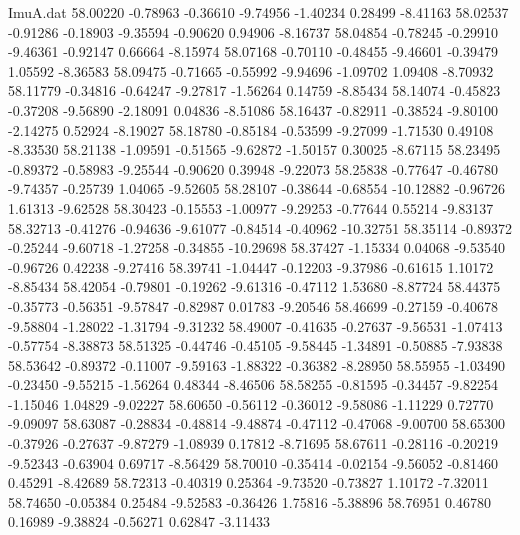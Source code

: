 \begin{filecontents}{ImuA.dat}
  58.00220   -0.78963   -0.36610   -9.74956   -1.40234    0.28499   -8.41163
  58.02537   -0.91286   -0.18903   -9.35594   -0.90620    0.94906   -8.16737
  58.04854   -0.78245   -0.29910   -9.46361   -0.92147    0.66664   -8.15974
  58.07168   -0.70110   -0.48455   -9.46601   -0.39479    1.05592   -8.36583
  58.09475   -0.71665   -0.55992   -9.94696   -1.09702    1.09408   -8.70932
  58.11779   -0.34816   -0.64247   -9.27817   -1.56264    0.14759   -8.85434
  58.14074   -0.45823   -0.37208   -9.56890   -2.18091    0.04836   -8.51086
  58.16437   -0.82911   -0.38524   -9.80100   -2.14275    0.52924   -8.19027
  58.18780   -0.85184   -0.53599   -9.27099   -1.71530    0.49108   -8.33530
  58.21138   -1.09591   -0.51565   -9.62872   -1.50157    0.30025   -8.67115
  58.23495   -0.89372   -0.58983   -9.25544   -0.90620    0.39948   -9.22073
  58.25838   -0.77647   -0.46780   -9.74357   -0.25739    1.04065   -9.52605
  58.28107   -0.38644   -0.68554  -10.12882   -0.96726    1.61313   -9.62528
  58.30423   -0.15553   -1.00977   -9.29253   -0.77644    0.55214   -9.83137
  58.32713   -0.41276   -0.94636   -9.61077   -0.84514   -0.40962  -10.32751
  58.35114   -0.89372   -0.25244   -9.60718   -1.27258   -0.34855  -10.29698
  58.37427   -1.15334    0.04068   -9.53540   -0.96726    0.42238   -9.27416
  58.39741   -1.04447   -0.12203   -9.37986   -0.61615    1.10172   -8.85434
  58.42054   -0.79801   -0.19262   -9.61316   -0.47112    1.53680   -8.87724
  58.44375   -0.35773   -0.56351   -9.57847   -0.82987    0.01783   -9.20546
  58.46699   -0.27159   -0.40678   -9.58804   -1.28022   -1.31794   -9.31232
  58.49007   -0.41635   -0.27637   -9.56531   -1.07413   -0.57754   -8.38873
  58.51325   -0.44746   -0.45105   -9.58445   -1.34891   -0.50885   -7.93838
  58.53642   -0.89372   -0.11007   -9.59163   -1.88322   -0.36382   -8.28950
  58.55955   -1.03490   -0.23450   -9.55215   -1.56264    0.48344   -8.46506
  58.58255   -0.81595   -0.34457   -9.82254   -1.15046    1.04829   -9.02227
  58.60650   -0.56112   -0.36012   -9.58086   -1.11229    0.72770   -9.09097
  58.63087   -0.28834   -0.48814   -9.48874   -0.47112   -0.47068   -9.00700
  58.65300   -0.37926   -0.27637   -9.87279   -1.08939    0.17812   -8.71695
  58.67611   -0.28116   -0.20219   -9.52343   -0.63904    0.69717   -8.56429
  58.70010   -0.35414   -0.02154   -9.56052   -0.81460    0.45291   -8.42689
  58.72313   -0.40319    0.25364   -9.73520   -0.73827    1.10172   -7.32011
  58.74650   -0.05384    0.25484   -9.52583   -0.36426    1.75816   -5.38896
  58.76951    0.46780    0.16989   -9.38824   -0.56271    0.62847   -3.11433

\end{filecontents}
